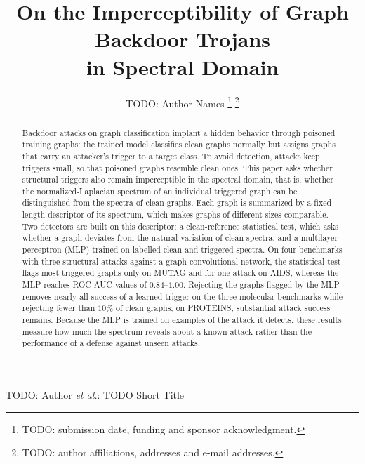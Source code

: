 \documentclass[journal]{IEEEtran}
\begin{document}
\title{On the Imperceptibility of Graph Backdoor Trojans\\ in Spectral Domain}

\author{TODO: Author Names%
\thanks{TODO: submission date, funding and sponsor acknowledgment.}%
\thanks{TODO: author affiliations, addresses and e-mail addresses.}}

\markboth{}%
{TODO: Author \MakeLowercase{\textit{et al.}}: TODO Short Title}

\maketitle

\begin{abstract}
Backdoor attacks on graph classification implant a hidden behavior through
poisoned training graphs: the trained model classifies clean graphs normally
but assigns graphs that carry an attacker's trigger to a target class. To
avoid detection, attacks keep triggers small, so that poisoned graphs resemble
clean ones. This paper asks whether structural triggers also remain
imperceptible in the spectral domain, that is, whether the normalized-Laplacian
spectrum of an individual triggered graph can be distinguished from the spectra
of clean graphs. Each graph is summarized by a fixed-length descriptor of its
spectrum, which makes graphs of different sizes comparable. Two detectors are
built on this descriptor: a clean-reference statistical test, which asks
whether a graph deviates from the natural variation of clean spectra, and a
multilayer perceptron (MLP) trained on labelled clean and triggered spectra. On
four benchmarks with three structural attacks against a graph convolutional
network, the statistical test flags most triggered graphs only on MUTAG and for
one attack on AIDS, whereas the MLP reaches ROC-AUC values of $0.84$--$1.00$.
Rejecting the graphs flagged by the MLP removes nearly all success of a learned
trigger on the three molecular benchmarks while rejecting fewer than $10\%$ of
clean graphs; on PROTEINS, substantial attack success remains. Because the MLP
is trained on examples of the attack it detects, these results measure how much
the spectrum reveals about a known attack rather than the performance of a
defense against unseen attacks.
\end{abstract}
\end{document}
